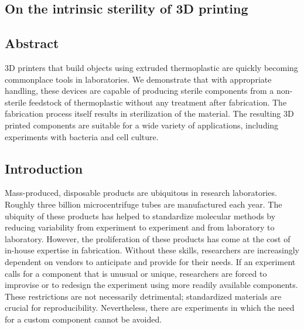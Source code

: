 

\begin{refsection}

\chapter{On the intrinsic sterility of 3D printing}



\section{Abstract} 

3D printers that build objects using extruded thermoplastic are
quickly becoming commonplace tools in laboratories. We demonstrate
that with appropriate handling, these devices are capable of producing
sterile components from a non-sterile feedstock of thermoplastic
without any treatment after fabrication. The fabrication process
itself results in sterilization of the material. The resulting 3D
printed components are suitable for a wide variety of applications,
including experiments with bacteria and cell culture.

\section{Introduction}

Mass-produced, disposable products are ubiquitous in research
laboratories.  Roughly three billion microcentrifuge tubes are
manufactured each year. \cite{eppy} The ubiquity of these products has
helped to standardize molecular methods by reducing variability from
experiment to experiment and from laboratory to laboratory. However,
the proliferation of these products has come at the cost of in-house
expertise in fabrication. Without these skills, researchers are
increasingly dependent on vendors to anticipate and provide for their
needs. If an experiment calls for a component that is unusual or
unique, researchers are forced to improvise or to redesign the
experiment using more readily available components. These restrictions
are not necessarily detrimental; standardized materials are crucial
for reproducibility. Nevertheless, there are experiments in which the
need for a custom component cannot be avoided.


\end{refsection}
